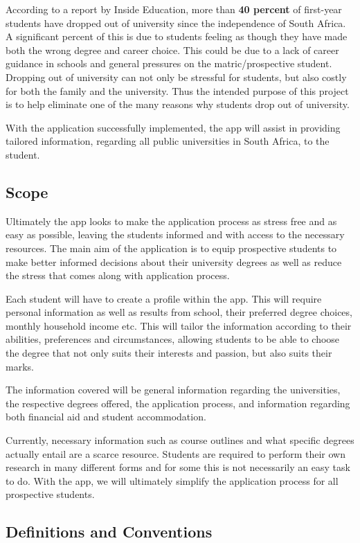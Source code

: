 \documentclass[a4paper, 12pt]{article}
\begin{document}
According to a report by Inside Education, more than \textbf{40 percent} of first-year students have dropped out of university since the independence of South Africa. A significant percent of this is due to students feeling as though they have made both the wrong degree and career choice. This could be due to a lack of career guidance in schools and general pressures on the matric/prospective student. Dropping out of university can not only be stressful for students, but also costly for both the family and the university. Thus the intended purpose of this project is to help eliminate one of the many reasons why students drop out of university.

With the application successfully implemented, the app will assist in providing tailored information, regarding all public universities in South Africa, to the student.

\subsection{Scope} 
Ultimately the app looks to make the application process as stress free and as easy as possible, leaving the students informed and with access to the necessary resources. The main aim of the application is to equip prospective students to make better informed decisions about their university degrees as well as reduce the stress that comes along with application process. 

Each student will have to create a profile within the app. This will require personal information as well as results from school, their preferred degree choices, monthly household income etc. This will tailor the information according to their abilities, preferences and circumstances, allowing students to be able to choose the degree that not only suits their interests and passion, but also suits their marks.

The information covered will be general information regarding the universities, the respective degrees offered, the application process, and information regarding both financial aid and student accommodation.

Currently, necessary information such as course outlines and what specific degrees actually entail are a scarce resource. Students are required to perform their own research in many different forms and for some this is not necessarily an easy task to do. With the app, we will ultimately simplify the application process for all prospective students.

\subsection{Definitions and Conventions}
\end{document}
